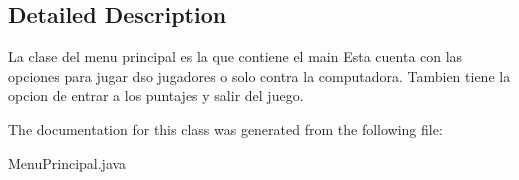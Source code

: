 \subsection{Detailed Description}
La clase del menu principal es la que contiene el main Esta cuenta con las opciones para jugar dso jugadores o solo contra la computadora. Tambien tiene la opcion de entrar a los puntajes y salir del juego. 

The documentation for this class was generated from the following file\+:\begin{DoxyCompactItemize}
\item 
Menu\+Principal.\+java\end{DoxyCompactItemize}
